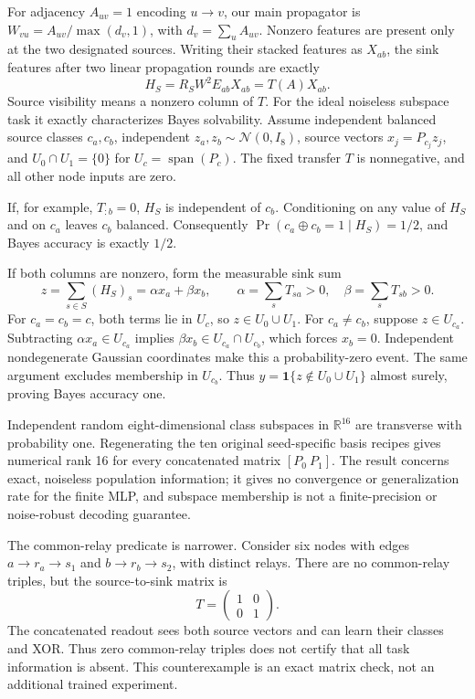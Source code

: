 \documentclass[10pt,letterpaper]{article}
\begin{document}
For adjacency $A_{uv}=1$ encoding $u\to v$, our main propagator is
$W_{vu}=A_{uv}/\max(d_v,1)$, with $d_v=\sum_u A_{uv}$.
Nonzero features are present only at the two designated sources.
Writing their stacked features as $X_{ab}$, the sink features after two
linear propagation rounds are exactly
\[
 H_S=R_SW^2E_{ab}X_{ab}=T(A)X_{ab}.
\]
Source visibility means a nonzero column of $T$. For the ideal noiseless
subspace task it exactly characterizes Bayes solvability. Assume independent
balanced source classes $c_a,c_b$, independent
$z_a,z_b\sim\mathcal N(0,I_8)$, source vectors $x_j=P_{c_j}z_j$,
and $U_0\cap U_1=\{0\}$ for $U_c=\operatorname{span}(P_c)$.
The fixed transfer $T$ is nonnegative, and all other node inputs are zero.

If, for example, $T_{:b}=0$, $H_S$ is independent of $c_b$.
Conditioning on any value of $H_S$ and on $c_a$ leaves $c_b$ balanced.
Consequently $\Pr(c_a\oplus c_b=1\mid H_S)=1/2$, and Bayes
accuracy is exactly $1/2$.

If both columns are nonzero, form the measurable sink sum
\[
 z=\sum_{s\in S}(H_S)_s=\alpha x_a+\beta x_b,\qquad
 \alpha=\sum_sT_{sa}>0,\quad\beta=\sum_sT_{sb}>0.
\]
For $c_a=c_b=c$, both terms lie in $U_c$, so $z\in U_0\cup U_1$.
For $c_a\ne c_b$, suppose $z\in U_{c_a}$. Subtracting
$\alpha x_a\in U_{c_a}$ implies $\beta x_b\in U_{c_a}\cap U_{c_b}$,
which forces $x_b=0$. Independent nondegenerate Gaussian coordinates
make this a probability-zero event. The same argument excludes membership
in $U_{c_b}$. Thus
$y=\mathbf 1\{z\notin U_0\cup U_1\}$ almost surely, proving Bayes
accuracy one.

Independent random eight-dimensional class subspaces in $\mathbb R^{16}$
are transverse with probability one. Regenerating the ten original
seed-specific basis recipes gives numerical rank 16 for every
concatenated matrix $[P_0\ P_1]$. The result concerns exact, noiseless
population information; it gives no convergence or generalization rate
for the finite MLP, and subspace membership is not a finite-precision or
noise-robust decoding guarantee.

The common-relay predicate is narrower. Consider six nodes with edges
$a\to r_a\to s_1$ and $b\to r_b\to s_2$, with distinct relays. There
are no common-relay triples, but the source-to-sink matrix is
\[
 T=\begin{pmatrix}1&0\\0&1\end{pmatrix}.
\]
The concatenated readout sees both source vectors and can learn their
classes and XOR. Thus zero common-relay triples does not certify that
all task information is absent. This counterexample is an exact matrix
check, not an additional trained experiment.
\end{document}
